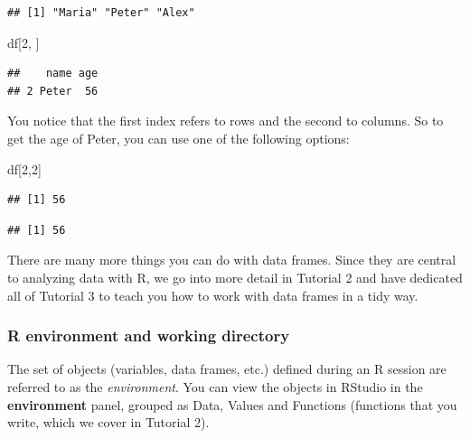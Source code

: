 \documentclass[
]{book}
\newenvironment{Shaded}{\begin{snugshade}}{\end{snugshade}}
\newcommand{\DecValTok}[1]{\textcolor[rgb]{0.00,0.00,0.81}{#1}}
\newcommand{\NormalTok}[1]{#1}
\newcommand{\SpecialCharTok}[1]{\textcolor[rgb]{0.00,0.00,0.00}{#1}}
\begin{document}
\begin{verbatim}
## [1] "Maria" "Peter" "Alex"
\end{verbatim}

\begin{Shaded}
\begin{Highlighting}[]
\NormalTok{df[}\DecValTok{2}\NormalTok{, ]}
\end{Highlighting}
\end{Shaded}

\begin{verbatim}
##    name age
## 2 Peter  56
\end{verbatim}

You notice that the first index refers to rows and the second to columns. So to get the age of Peter, you can use one of the following options:

\begin{Shaded}
\begin{Highlighting}[]
\NormalTok{df[}\DecValTok{2}\NormalTok{,}\DecValTok{2}\NormalTok{]}
\end{Highlighting}
\end{Shaded}

\begin{verbatim}
## [1] 56
\end{verbatim}

\begin{Shaded}
\end{Shaded}

\begin{verbatim}
## [1] 56
\end{verbatim}

There are many more things you can do with data frames. Since they are central to analyzing data with R, we go into more detail in Tutorial 2 and have dedicated all of \protect\hypertarget{data_wrangling}{}{Tutorial 3} to teach you how to work with data frames in a tidy way.

\hypertarget{r-environment-and-working-directory}{%
\subsubsection{R environment and working directory}\label{r-environment-and-working-directory}}

The set of objects (variables, data frames, etc.) defined during an R session are referred to as the \emph{environment}. You can view the objects in RStudio in the \textbf{environment} panel, grouped as Data, Values and Functions (functions that you write, which we cover in Tutorial 2).
\end{document}
